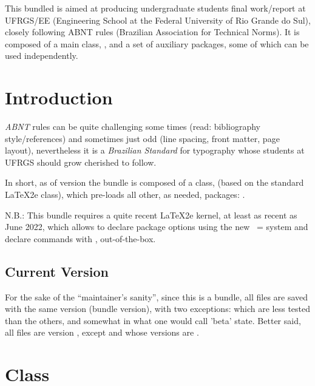 \documentclass[dctools,english]{ufrgscca} %
\begin{document}
	\dcMakeTitle


	\begin{dcAbstract}
		This bundled is aimed at producing undergraduate students final work/report at UFRGS/EE (Engineering School at the Federal University of Rio Grande do Sul), closely following ABNT rules (Brazilian Association for Technical Norms). It is composed of a main class, , and a set of auxiliary packages, some of which can be used independently.

	\end{dcAbstract}

\tableofcontents

	\section{Introduction}
	\emph{ABNT} rules can be quite challenging some times (read: bibliography style/references) and sometimes just odd (line spacing, front matter, page layout), nevertheless it is a \emph{Brazilian Standard} for typography whose students at UFRGS should grow cherished to follow.

	In short, as of version \ufrgsccaversion\space the bundle is composed of a class,  (based on the standard \LaTeX2e  class), which pre-loads all other, as needed, packages: .

	N.B.: This bundle requires a quite recent \LaTeX2e kernel, at least as recent as June 2022, which allows to declare package options using the new ~= system and declare commands with \Macro{\NewDocumentCommand}{}, out-of-the-box.

\subsection{Current Version}
For the sake of the “maintainer's sanity”, since this is a bundle, all files are saved with the same version (bundle version), with two exceptions:   which are less tested than the others, and somewhat in what one would call 'beta' state. Better said, all files are version \ufrgsccaversion, except  and  whose versions are \ufrgsccacurrversion.

\section{ Class}
\end{document}
